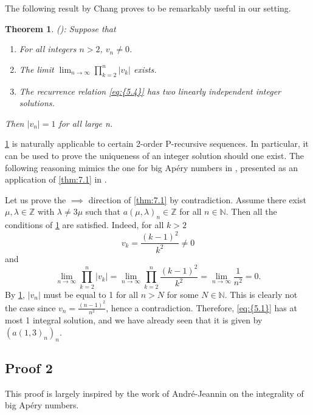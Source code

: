 \documentclass[11pt]{article}
\theoremstyle{definition}
\theoremstyle{plain}
\newtheorem{thm}[defi]{Theorem}
\theoremstyle{remark}
\begin{document}
The following result by Chang \cite{C84} proves to be remarkably useful in our setting.

\begin{thm}\label{thm:7.2}(\cite{C84}): Suppose that
\begin{enumerate}
    \item[a)]For all integers $n>2$, $v_n \neq 0$.
    \item[b)] The limit $\lim_{n\rightarrow\infty}\prod_{k=2}^{n}|v_k|$ exists.
    \item[c)] The recurrence relation \eqref{eq:{5.4}} has two linearly independent integer solutions.
\end{enumerate}  
Then $|v_n|=1$ for all large n.
\end{thm}

\cref{thm:7.2} is naturally applicable to certain 2-order P-recursive sequences. In particular, it can be used to prove the uniqueness of an integer solution should one exist. The following reasoning mimics the one for big Apéry numbers in \cite{C84}, presented as an application of \cref{thm:7.1} in \cite{C84}. 

Let us prove the $\implies$ direction of \cref{thm:7.1} by contradiction. Assume there exist $\mu,\lambda \in \mathbb{Z}$ with $\lambda \neq 3\mu$ such that $a(\mu,\lambda)_n \in \mathbb{Z}$ for all $n \in \mathbb{N}$. Then all the conditions of \cref{thm:7.2} are satisfied. Indeed, for all $k>2$ 
\[v_k = \frac{(k-1)^2}{k^2} \neq 0\]
and
\[\lim_{n\rightarrow\infty}\prod_{k=2}^{n}|v_k| = \lim_{n\rightarrow\infty}\prod_{k=2}^{n}\frac{(k-1)^2}{k^2} = \lim_{n\rightarrow\infty}\frac{1}{n^2} = 0.\]
By \cref{thm:7.2}, $|v_n|$ must be equal to 1 for all $n > N$ for some $N \in \mathbb{N}$. This is clearly not the case since $v_n = \frac{(n-1)^2}{n^2}$, hence a contradiction. Therefore, \eqref{eq:{5.1}} has at most 1 integral solution, and we have already seen that it is given by $(a(1,3)_n)_n$.
\subsection{Proof 2}
This proof is largely inspired by the work of André-Jeannin \cite{AJ91} on the integrality of big Apéry numbers.
\end{document}
